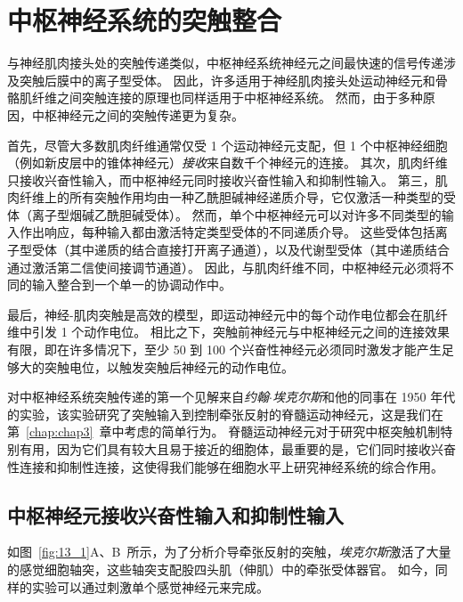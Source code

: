 \chapter{中枢神经系统的突触整合} \label{chap:chap13}

与神经肌肉接头处的突触传递类似，中枢神经系统神经元之间最快速的信号传递涉及突触后膜中的离子型受体。
因此，许多适用于神经肌肉接头处运动神经元和骨骼肌纤维之间突触连接的原理也同样适用于中枢神经系统。
然而，由于多种原因，中枢神经元之间的突触传递更为复杂。


首先，尽管大多数肌肉纤维通常仅受 1 个运动神经元支配，但 1 个中枢神经细胞（例如新皮层中的锥体神经元）\textit{接收}来自数千个神经元的连接。
其次，肌肉纤维只接收兴奋性输入，而中枢神经元同时接收兴奋性输入和抑制性输入。
第三，肌肉纤维上的所有突触作用均由一种乙酰胆碱神经递质介导，它仅激活一种类型的受体（离子型烟碱乙酰胆碱受体）。
然而，单个中枢神经元可以对许多不同类型的输入作出响应，每种输入都由激活特定类型受体的不同递质介导。
这些受体包括离子型受体（其中递质的结合直接打开离子通道），以及代谢型受体（其中递质结合通过激活第二信使间接调节通道）。
因此，与肌肉纤维不同，中枢神经元必须将不同的输入整合到一个单一的协调动作中。


最后，神经-肌肉突触是高效的模型，即运动神经元中的每个动作电位都会在肌纤维中引发 1 个动作电位。
相比之下，突触前神经元与中枢神经元之间的连接效果有限，即在许多情况下，至少 50 到 100 个兴奋性神经元必须同时激发才能产生足够大的突触电位，以触发突触后神经元的动作电位。


对中枢神经系统突触传递的第一个见解来自\textit{约翰$\cdot$埃克尔斯}和他的同事在 1950 年代的实验，该实验研究了突触输入到控制牵张反射的脊髓运动神经元，这是我们在第~\ref{chap:chap3}~章中考虑的简单行为。
脊髓运动神经元对于研究中枢突触机制特别有用，因为它们具有较大且易于接近的细胞体，最重要的是，它们同时接收兴奋性连接和抑制性连接，这使得我们能够在细胞水平上研究神经系统的综合作用。



\section{中枢神经元接收兴奋性输入和抑制性输入}

如图~\ref{fig:13_1}A、B~所示，为了分析介导牵张反射的突触，\textit{埃克尔斯}激活了大量的感觉细胞轴突，这些轴突支配股四头肌（伸肌）中的牵张受体器官。
如今，同样的实验可以通过刺激单个感觉神经元来完成。


